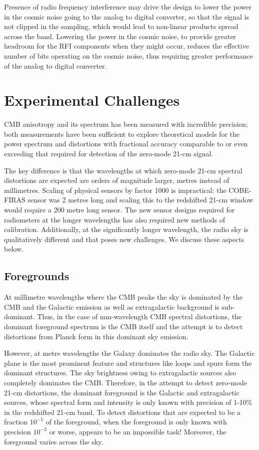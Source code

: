  Presence of radio frequency interference may drive the design to lower the power in the cosmic noise going to the analog to digital converter, so that the signal is not clipped in the sampling, which would lead to non-linear products spread across the band.  Lowering the power in the cosmic noise, to provide greater headroom for the RFI components when they might occur, reduces the effective number of bits operating on the cosmic noise, thus requiring greater performance of the analog to digital converter.
   

\section{Experimental Challenges}

CMB anisotropy and its spectrum has been measured with incredible precision; both measurements have been sufficient to explore theoretical models for the power spectrum and distortions with fractional accuracy comparable to or even exceeding that required for detection of the zero-mode 21-cm signal. 

The key difference is that the wavelengths at which zero-mode 21-cm spectral distortions are expected are orders of magnitude larger, metres instead of millimetres.  Scaling of physical sensors by factor 1000 is impractical: the COBE-FIRAS sensor was 2 metres long and scaling this to the redshifted 21-cm window would require a 200 metre long sensor.  The new sensor designs required for radiometers at the longer wavelengths has also required new methods of calibration.  Additionally, at the significantly longer wavelength, the radio sky is qualitatively different and that poses new challenges.  We discuss these aspects below.

\subsection{Foregrounds}

At millimetre wavelengths where the CMB peaks the sky is dominated by the CMB and the Galactic emission as well as extragalactic background is sub-dominant. Thus, in the case of mm-wavelength CMB spectral distortions, the dominant foreground spectrum is the CMB itself and the attempt is to detect distortions from Planck form in this dominant sky emission.

However, at metre wavelengths the Galaxy dominates the radio sky.  The Galactic plane is the most prominent feature and structures like loops and spurs form the dominant structures.  The sky brightness owing to extragalactic sources also completely dominates the CMB. Therefore, in the attempt to detect zero-mode 21-cm distortions, the dominant foreground is the Galactic and extragalactic sources, whose spectral form and intensity is only known with precision of 1-10\% in the redshifted 21-cm band.   To detect distortions that are expected to be a fraction $10^{-5}$ of the foreground, when the foreground is only known with precision $10^{-2}$ or worse, appears to be an impossible task!  Moreover, the foreground varies across the sky.

